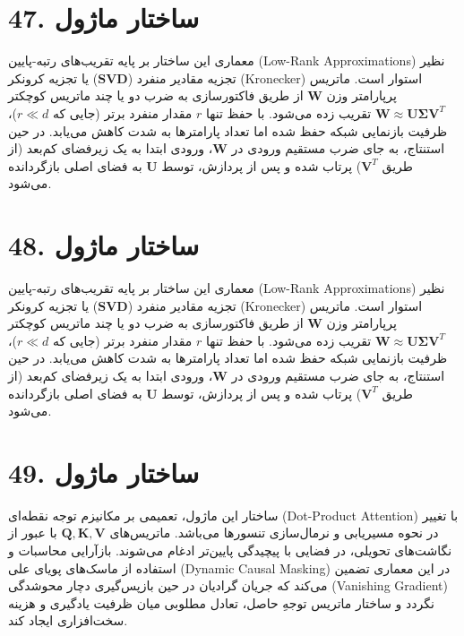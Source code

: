 \documentclass[12pt,a4paper]{report}
\begin{document}
\section*{47. ساختار ماژول }
معماری این ساختار بر پایه تقریب‌های رتبه-پایین (Low-Rank Approximations) نظیر تجزیه مقادیر منفرد ($\mathbf{SVD}$) یا تجزیه کرونکر (Kronecker) استوار است. ماتریس پرپارامتر وزن $\mathbf{W}$ از طریق فاکتورسازی به ضرب دو یا چند ماتریس کوچکتر $\mathbf{W} \approx \mathbf{U} \mathbf{\Sigma} \mathbf{V}^T$ تقریب زده می‌شود. با حفظ تنها $r$ مقدار منفرد برتر (جایی که $r \ll d$)، ظرفیت بازنمایی شبکه حفظ شده اما تعداد پارامترها به شدت کاهش می‌یابد. در حین استنتاج، به جای ضرب مستقیم ورودی در $\mathbf{W}$، ورودی ابتدا به یک زیرفضای کم‌بعد (از طریق $\mathbf{V}^T$) پرتاب شده و پس از پردازش، توسط $\mathbf{U}$ به فضای اصلی بازگردانده می‌شود.

\section*{48. ساختار ماژول }
معماری این ساختار بر پایه تقریب‌های رتبه-پایین (Low-Rank Approximations) نظیر تجزیه مقادیر منفرد ($\mathbf{SVD}$) یا تجزیه کرونکر (Kronecker) استوار است. ماتریس پرپارامتر وزن $\mathbf{W}$ از طریق فاکتورسازی به ضرب دو یا چند ماتریس کوچکتر $\mathbf{W} \approx \mathbf{U} \mathbf{\Sigma} \mathbf{V}^T$ تقریب زده می‌شود. با حفظ تنها $r$ مقدار منفرد برتر (جایی که $r \ll d$)، ظرفیت بازنمایی شبکه حفظ شده اما تعداد پارامترها به شدت کاهش می‌یابد. در حین استنتاج، به جای ضرب مستقیم ورودی در $\mathbf{W}$، ورودی ابتدا به یک زیرفضای کم‌بعد (از طریق $\mathbf{V}^T$) پرتاب شده و پس از پردازش، توسط $\mathbf{U}$ به فضای اصلی بازگردانده می‌شود.

\section*{49. ساختار ماژول }
ساختار این ماژول، تعمیمی بر مکانیزم توجه نقطه‌ای (Dot-Product Attention) با تغییر در نحوه مسیریابی و نرمال‌سازی تنسورها می‌باشد. ماتریس‌های $\mathbf{Q, K, V}$ با عبور از نگاشت‌های تحویلی، در فضایی با پیچیدگی پایین‌تر ادغام می‌شوند. بازآرایی محاسبات و استفاده از ماسک‌های پویای علی (Dynamic Causal Masking) در این معماری تضمین می‌کند که جریان گرادیان در حین بازپس‌گیری دچار محوشدگی (Vanishing Gradient) نگردد و ساختار ماتریس توجهِ حاصل، تعادل مطلوبی میان ظرفیت یادگیری و هزینه سخت‌افزاری ایجاد کند.
\end{document}
